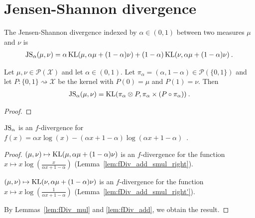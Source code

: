 \section{Jensen-Shannon divergence}

\begin{definition}
  \label{def:jensenShannon}
  The Jensen-Shannon divergence indexed by $\alpha \in (0,1)$ between two measures $\mu$ and $\nu$ is
  \begin{align*}
    \operatorname{JS}_\alpha(\mu, \nu) = \alpha \operatorname{KL}(\mu, \alpha \mu + (1 - \alpha)\nu) + (1 - \alpha) \operatorname{KL}(\nu, \alpha \mu + (1 - \alpha)\nu) \: .
  \end{align*}
\end{definition}


\begin{lemma}
  \label{lem:jensenShannon_eq_kl}
  Let $\mu, \nu \in \mathcal P(\mathcal X)$ and let $\alpha \in (0, 1)$. Let $\pi_\alpha = (\alpha, 1 - \alpha) \in \mathcal P(\{0,1\})$ and let $P : \{0,1\} \rightsquigarrow \mathcal X$ be the kernel with $P(0) = \mu$ and $P(1) = \nu$. Then
  \begin{align*}
  \operatorname{JS}_\alpha(\mu, \nu) = \operatorname{KL}(\pi_\alpha \otimes P, \pi_\alpha \times (P \circ \pi_\alpha)) \: .
  \end{align*}
\end{lemma}

\begin{proof}%
\uses{}

\end{proof}


\begin{lemma}
  \label{lem:jensenShannon_eq_fDiv}
  $\operatorname{JS}_\alpha$ is an $f$-divergence for $f(x) = \alpha x \log(x) - (\alpha x + 1 - \alpha) \log (\alpha x + 1 - \alpha)$~.
\end{lemma}

\begin{proof}%
{}
$(\mu, \nu) \mapsto \operatorname{KL}(\mu, \alpha \mu + (1 - \alpha) \nu)$ is an $f$-divergence for the function $x \mapsto x\log\left(\frac{x}{\alpha x + 1 - \alpha}\right)$ (Lemma~\ref{lem:fDiv_add_smul_right}).

$(\mu, \nu) \mapsto \operatorname{KL}(\nu, \alpha \mu + (1 - \alpha) \nu)$ is an $f$-divergence for the function $x \mapsto x\log\left(\frac{1}{\alpha x + 1 - \alpha}\right)$ (Lemma~\ref{lem:fDiv_add_smul_right'}).

By Lemmas~\ref{lem:fDiv_mul} and \ref{lem:fDiv_add}, we obtain the result.
\end{proof}


